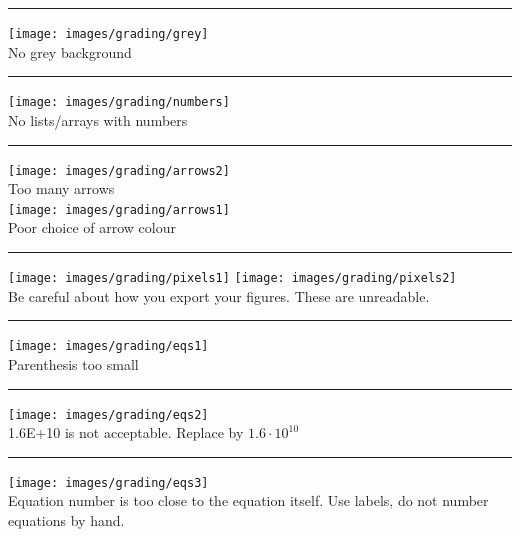 \par\noindent\rule{\textwidth}{0.4pt}
\begin{center}
\texttt{[image: images/grading/grey]}\\
No grey background
\end{center}


\par\noindent\rule{\textwidth}{0.4pt}
\begin{center}
\texttt{[image: images/grading/numbers]}\\
No lists/arrays with numbers
\end{center}

\par\noindent\rule{\textwidth}{0.4pt}
\begin{center}
\texttt{[image: images/grading/arrows2]}\\
Too many arrows\\
\texttt{[image: images/grading/arrows1]}\\
Poor choice of arrow colour
\end{center}

\par\noindent\rule{\textwidth}{0.4pt}
\begin{center}
\texttt{[image: images/grading/pixels1]}
\texttt{[image: images/grading/pixels2]}\\
Be careful about how you export your figures. These are unreadable.
\end{center}
 
\par\noindent\rule{\textwidth}{0.4pt}
\begin{center}
\texttt{[image: images/grading/eqs1]}\\
Parenthesis too small
\end{center}

\par\noindent\rule{\textwidth}{0.4pt}
\begin{center}
\texttt{[image: images/grading/eqs2]}\\
1.6E+10 is not acceptable. Replace by $1.6\cdot 10^{10}$
\end{center}

\par\noindent\rule{\textwidth}{0.4pt}
\begin{center}
\texttt{[image: images/grading/eqs3]}\\
Equation number is too close to the equation itself. Use labels, 
do not number equations by hand.
\end{center}

